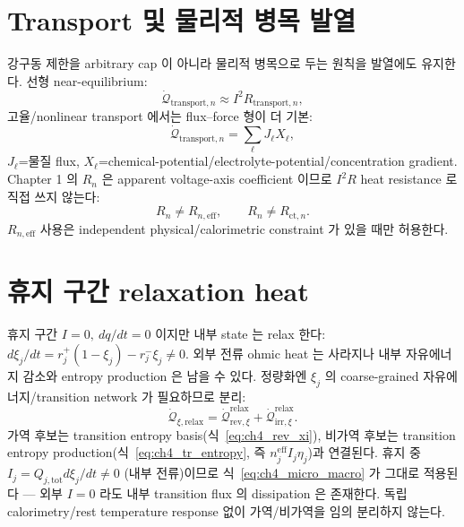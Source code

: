 \documentclass[11pt,a4paper]{article}
\newcommand{\eff}{\mathrm{eff}}
\newcommand{\tot}{\mathrm{tot}}
\newcommand{\irr}{\mathrm{irr}}
\newcommand{\rev}{\mathrm{rev}}
\newcommand{\rlx}{\mathrm{relax}}
\newcommand{\ct}{\mathrm{ct}}
\newcommand{\transp}{\mathrm{transport}}
\begin{document}
\section{Transport 및 물리적 병목 발열}\label{sec:ch4_transport}
강구동 제한을 arbitrary cap 이 아니라 물리적 병목으로 두는 원칙을 발열에도 유지한다. 선형 near-equilibrium:
\begin{equation}
\dot{\mathcal Q}_{\transp,n}\approx I^2R_{\transp,n},
\label{eq:ch4_transport_i2r}
\end{equation}
고율/nonlinear transport 에서는 flux--force 형이 더 기본:
\begin{equation}
\dot{\mathcal Q}_{\transp,n}=\sum_\ell J_\ell X_\ell,
\label{eq:ch4_transport_ff}
\end{equation}
$J_\ell$=물질 flux, $X_\ell$=chemical-potential/electrolyte-potential/concentration gradient. Chapter 1 의
$R_n$ 은 apparent voltage-axis coefficient 이므로 $I^2R$ heat resistance 로 직접 쓰지 않는다:
\begin{equation}
R_n\ne R_{n,\eff},\qquad R_n\ne R_{\ct,n}.
\label{eq:ch4_Rsep}
\end{equation}
$R_{n,\eff}$ 사용은 independent physical/calorimetric constraint 가 있을 때만 허용한다.

\section{휴지 구간 relaxation heat}\label{sec:ch4_rest}
휴지 구간 $I=0,\ dq/dt=0$ 이지만 내부 state 는 relax 한다:
$d\xi_j/dt=r_j^+(1-\xi_j)-r_j^-\xi_j\ne0$. 외부 전류 ohmic heat 는 사라지나 내부 자유에너지 감소와 entropy
production 은 남을 수 있다. 정량화엔 $\xi_j$ 의 coarse-grained 자유에너지/transition network 가 필요하므로 분리:
\begin{equation}
\dot{\mathcal Q}_{\xi,\rlx}=\dot{\mathcal Q}_{\rev,\xi}^{\rlx}+\dot{\mathcal Q}_{\irr,\xi}^{\rlx}.
\label{eq:ch4_rest_split}
\end{equation}
가역 후보는 transition entropy basis(식~\eqref{eq:ch4_rev_xi}), 비가역 후보는 transition entropy
production(식~\eqref{eq:ch4_tr_entropy}, 즉 $n_j^{\eff}I_j\eta_j$)과 연결된다. 휴지 중 $I_j=Q_{j,\tot}d\xi_j/dt\ne0$
(내부 전류)이므로 식~\eqref{eq:ch4_micro_macro} 가 그대로 적용된다 — 외부 $I=0$ 라도 내부 transition flux 의
dissipation 은 존재한다. 독립 calorimetry/rest temperature response 없이 가역/비가역을 임의 분리하지 않는다.
\end{document}
